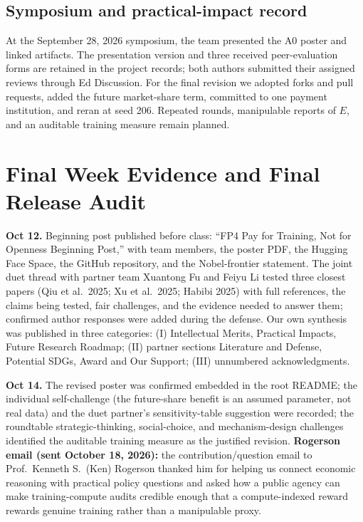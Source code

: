 \subsection{Symposium and practical-impact record}
At the September 28, 2026 symposium, the team presented the A0 poster and linked artifacts. The presentation version and three received peer-evaluation forms are retained in the project records; both authors submitted their assigned reviews through Ed Discussion. For the final revision we adopted forks and pull requests, added the future market-share term, committed to one payment institution, and reran  at seed 206. Repeated rounds, manipulable reports of $E$, and an auditable training measure remain planned.

\section{Final Week Evidence and Final Release Audit}
\textbf{Oct 12.} Beginning post published before class: ``FP4 Pay for Training, Not for Openness Beginning Post,'' with team members, the poster PDF, the Hugging Face Space, the GitHub repository, and the Nobel-frontier statement. The joint duet thread with partner team Xuantong Fu and Feiyu Li tested three closest papers (Qiu et al.\ 2025; Xu et al.\ 2025; Habibi 2025) with full references, the claims being tested, fair challenges, and the evidence needed to answer them; confirmed author responses were added during the defense. Our own synthesis was published in three categories: (I) Intellectual Merits, Practical Impacts, Future Research Roadmap; (II) partner sections Literature and Defense, Potential SDGs, Award and Our Support; (III) unnumbered acknowledgments.

\textbf{Oct 14.} The revised poster was confirmed embedded in the root README; the individual self-challenge (the future-share benefit is an assumed parameter, not real data) and the duet partner's sensitivity-table suggestion were recorded; the roundtable strategic-thinking, social-choice, and mechanism-design challenges identified the auditable training measure as the justified revision. \textbf{Rogerson email (sent October 18, 2026):} the contribution/question email to Prof.\ Kenneth S.\ (Ken) Rogerson thanked him for helping us connect economic reasoning with practical policy questions and asked how a public agency can make training-compute audits credible enough that a compute-indexed reward rewards genuine training rather than a manipulable proxy.

